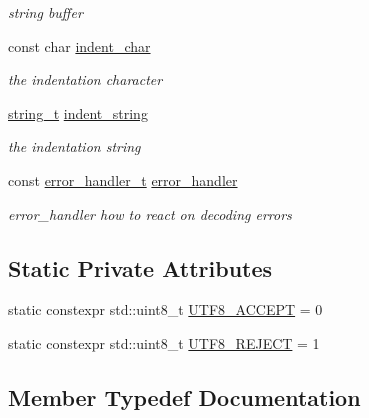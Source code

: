 \begin{DoxyCompactItemize}
\begin{DoxyCompactList}\small\item\em string buffer \end{DoxyCompactList}\item 
const char \hyperlink{classnlohmann_1_1detail_1_1serializer_a9a55e6b028d09676fe35aefa0c72ea5b}{indent\+\_\+char}
\begin{DoxyCompactList}\small\item\em the indentation character \end{DoxyCompactList}\item 
\hyperlink{classnlohmann_1_1detail_1_1serializer_ad08aa54fac1dd0a453320c54137d45ba}{string\+\_\+t} \hyperlink{classnlohmann_1_1detail_1_1serializer_ae9268a10d88a5526e32735a55a132fc6}{indent\+\_\+string}
\begin{DoxyCompactList}\small\item\em the indentation string \end{DoxyCompactList}\item 
const \hyperlink{namespacenlohmann_1_1detail_a5a76b60b26dc8c47256a996d18d967df}{error\+\_\+handler\+\_\+t} \hyperlink{classnlohmann_1_1detail_1_1serializer_a09d5a046fb0f7cb61977d6e5fbe8b3a1}{error\+\_\+handler}
\begin{DoxyCompactList}\small\item\em error\+\_\+handler how to react on decoding errors \end{DoxyCompactList}\end{DoxyCompactItemize}
\subsection*{Static Private Attributes}
\begin{DoxyCompactItemize}
\item 
static constexpr std\+::uint8\+\_\+t \hyperlink{classnlohmann_1_1detail_1_1serializer_a2311a8c756c4a119aa82cd55301d13bc}{U\+T\+F8\+\_\+\+A\+C\+C\+E\+PT} = 0
\item 
static constexpr std\+::uint8\+\_\+t \hyperlink{classnlohmann_1_1detail_1_1serializer_a833bd5805e4380549f4e21c304820d6d}{U\+T\+F8\+\_\+\+R\+E\+J\+E\+CT} = 1
\end{DoxyCompactItemize}


\subsection{Member Typedef Documentation}
